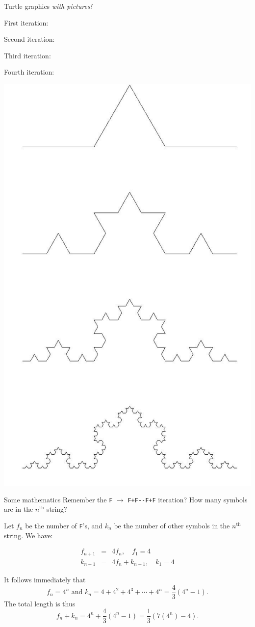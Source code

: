 \documentclass[bigger]{beamer}
\begin{document}
\begin{frame}[label={sec:org8c36abe}]{Turtle graphics \emph{with pictures!}}

First iteration:~

Second iteration:~

Third iteration:~

Fourth iteration:~

\begin{center}
\includegraphics[width=.9\linewidth]{./koch_snowflake.jpg}
\end{center}
\end{frame}

\begin{frame}[fragile,label={sec:org40203a3}]{Some mathematics}
 Remember the \texttt{F} \(\rightarrow\) \texttt{F+F-{}-F+F} iteration?  How many symbols 
are in the \(n^{\text{th}}\) string?

Let \(f_n\) be the number of \texttt{F}'s, and \(k_n\) be the number of other
symbols in the \(n^{\text{th}}\) string. We have:

\begin{eqnarray*}
f_{n+1}&=&4f_n,\quad f_1=4\\
k_{n+1}&=&4f_n+k_{n-1},\quad k_1=4
\end{eqnarray*}

It follows immediately that
\[
f_n=4^n\mbox{ and }k_n=4+4^2+4^3+\cdots+4^n=\frac{4}{3}(4^n-1).
\]
The total length is thus
\[
f_n+k_n=4^n+\frac{4}{3}(4^n-1)=\frac{1}{3}(7(4^n)-4).
\]
\end{frame}
\end{document}
